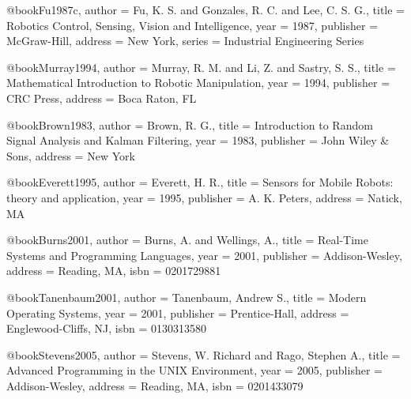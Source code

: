 @book{Fu1987c,
  author = {Fu, K. S. and Gonzales, R. C. and Lee, C. S. G.},
  title = {Robotics Control, Sensing, Vision and Intelligence},
  year = {1987},
  publisher = {McGraw-Hill},
  address = {New York},
  series = {Industrial Engineering Series}
}

@book{Murray1994,
  author = {Murray, R. M. and Li, Z. and Sastry, S. S.},
  title = {Mathematical Introduction to Robotic Manipulation},
  year = {1994},
  publisher = {CRC Press},
  address = {Boca Raton, FL}
}

@book{Brown1983,
  author = {Brown, R. G.},
  title = {Introduction to Random Signal Analysis and Kalman Filtering},
  year = {1983},
  publisher = {John Wiley \& Sons},
  address = {New York}
}

@book{Everett1995,
  author = {Everett, H. R.},
  title = {Sensors for Mobile Robots: theory and application},
  year = {1995},
  publisher = {A. K. Peters},
  address = {Natick, MA}
}

%

@book{Burns2001,
  author = {Burns, A. and Wellings, A.},
  title = {Real-Time Systems and Programming Languages},
  year = {2001},
  publisher = {Addison-Wesley},
  address = {Reading, MA},
  isbn = {0201729881}
}

@book{Tanenbaum2001,
  author = {Tanenbaum, Andrew S.},
  title = {Modern Operating Systems},
  year = {2001},
  publisher = {Prentice-Hall},
  address = {Englewood-Cliffs, NJ},
  isbn = {0130313580}
}

@book{Stevens2005,
  author = {Stevens, W. Richard and Rago, Stephen A.},
  title = {Advanced Programming in the UNIX Environment},
  year = {2005},
  publisher = {Addison-Wesley},
  address = {Reading, MA},
  isbn = {0201433079}
}

